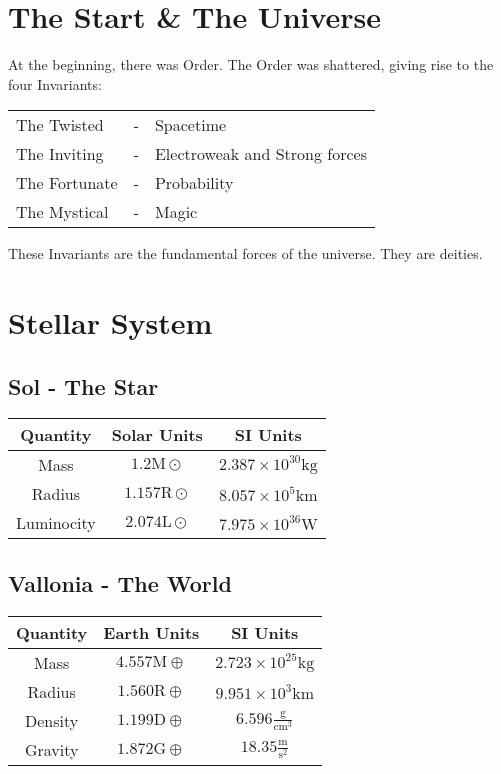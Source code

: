 \documentclass[
a4paper,
10pt,
twoside,
]{article}
\begin{document}
\titleinf
\maketitle
\startmcols

\section{The Start \& The Universe}

At the beginning, there was Order.
The Order was shattered, giving rise to the four Invariants:
\begin{table}[H]
	\centering
	\begin{tabular}{lcl}
		The Twisted &-& Spacetime\\
		The Inviting &-& Electroweak and Strong forces\\
		The Fortunate &-& Probability\\
		The Mystical &-& Magic
	\end{tabular}
\end{table}
These Invariants are the fundamental forces of the universe.
They are deities.

\section{Stellar System}

\subsection{Sol - The Star}

\begin{table}[H]
	\centering
	\begin{tabular}{c|c|c}
		Quantity & Solar Units & SI Units \\\hline
		Mass & $1.2\text{M}\odot$ & $2.387\times 10^{30}\text{kg}$\\
		Radius & $1.157\text{R}\odot$ & $8.057\times 10^5\text{km}$\\
		Luminocity & $2.074\text{L}\odot$ & $7.975\times 10^{36}\text{W}$
	\end{tabular}
\end{table}

\subsection{Vallonia - The World}

\begin{table}[H]
	\centering
	\begin{tabular}{c|c|c}
		Quantity & Earth Units & SI Units \\\hline
		Mass & $4.557\text{M}\oplus$ & $2.723\times 10^{25}\text{kg}$\\
		Radius & $1.560\text{R}\oplus$ & $9.951\times 10^3\text{km}$\\
		Density & $1.199\text{D}\oplus$ & $6.596\frac{\text{g}}{\text{cm}^3}$\\
		Gravity & $1.872\text{G}\oplus$ & $18.35\frac{\text{m}}{\text{s}^2}$
	\end{tabular}
\end{table}
\end{document}
